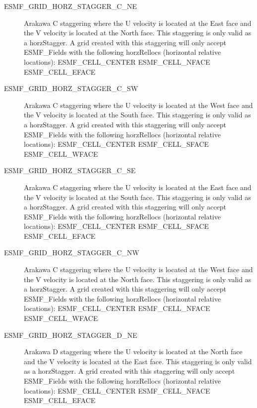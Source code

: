 \begin{description}
   \item [ESMF\_GRID\_HORZ\_STAGGER\_C\_NE]
         Arakawa C staggering where the U velocity is located at the East face
         and the V velocity is located at the North face.  This staggering is
         only valid as a horzStagger.  A grid created with this staggering will
         only accept ESMF\_Fields with the following horzRellocs (horizontal
         relative locations):
             ESMF\_CELL\_CENTER
             ESMF\_CELL\_NFACE
             ESMF\_CELL\_EFACE

   \item [ESMF\_GRID\_HORZ\_STAGGER\_C\_SW]
         Arakawa C staggering where the U velocity is located at the West face
         and the V velocity is located at the South face.  This staggering is
         only valid as a horzStagger.  A grid created with this staggering will
         only accept ESMF\_Fields with the following horzRellocs (horizontal
         relative locations):
             ESMF\_CELL\_CENTER
             ESMF\_CELL\_SFACE
             ESMF\_CELL\_WFACE

   \item [ESMF\_GRID\_HORZ\_STAGGER\_C\_SE]
         Arakawa C staggering where the U velocity is located at the East face
         and the V velocity is located at the South face.  This staggering is
         only valid as a horzStagger.  A grid created with this staggering will
         only accept ESMF\_Fields with the following horzRellocs (horizontal
         relative locations):
             ESMF\_CELL\_CENTER
             ESMF\_CELL\_SFACE
             ESMF\_CELL\_EFACE

   \item [ESMF\_GRID\_HORZ\_STAGGER\_C\_NW]
         Arakawa C staggering where the U velocity is located at the West face
         and the V velocity is located at the North face.  This staggering is
         only valid as a horzStagger.  A grid created with this staggering will
         only accept ESMF\_Fields with the following horzRellocs (horizontal
         relative locations):
             ESMF\_CELL\_CENTER
             ESMF\_CELL\_NFACE
             ESMF\_CELL\_WFACE

   \item [ESMF\_GRID\_HORZ\_STAGGER\_D\_NE]
         Arakawa D staggering where the U velocity is located at the North face
         and the V velocity is located at the East face.  This staggering is
         only valid as a horzStagger.  A grid created with this staggering will 
         only accept ESMF\_Fields with the following horzRellocs (horizontal
         relative locations):
             ESMF\_CELL\_CENTER
             ESMF\_CELL\_NFACE
             ESMF\_CELL\_EFACE


\end{description}
